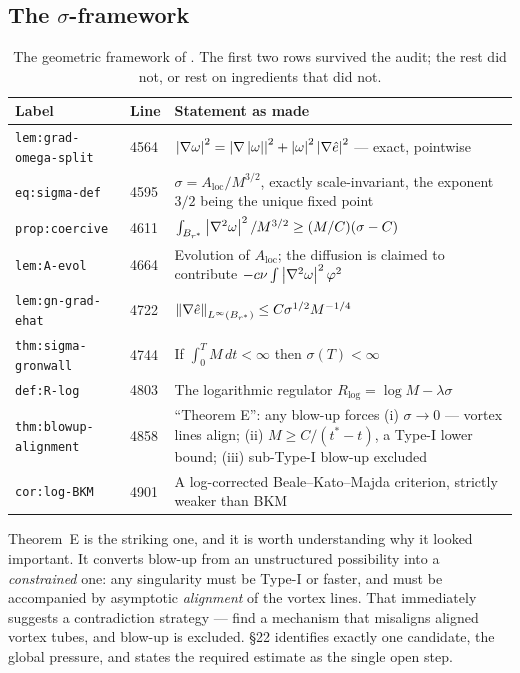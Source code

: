 \subsection{The \texorpdfstring{\(\sigma\)}{sigma}-framework}

\begin{table}[ht]
\centering
\small
\begin{tabular}{@{}l l p{}@{}}
\toprule
Label & Line & Statement as made \\
\midrule
\texttt{lem:grad-omega-split} & 4564
  & \(\left|\nabla\omega\right|^2=\left|\nabla\left|\omega\right|\right|^2
    +\left|\omega\right|^2\left|\nabla\hat{e}\right|^2\) --- exact, pointwise \\[3pt]
\texttt{eq:sigma-def} & 4595
  & \(\sigma=A_{\mathrm{loc}}/M^{3/2}\), exactly scale-invariant, the exponent
    \(3/2\) being the unique fixed point \\[3pt]
\texttt{prop:coercive} & 4611
  & \(\int_{B_{r^{*}}}\left|\nabla^2\omega\right|^2/M^{3/2}\ge(M/C)(\sigma-C)\) \\[3pt]
\texttt{lem:A-evol} & 4664
  & Evolution of \(A_{\mathrm{loc}}\); the diffusion is claimed to contribute
    \(-c\nu\int\left|\nabla^2\omega\right|^2\varphi^2\) \\[3pt]
\texttt{lem:gn-grad-ehat} & 4722
  & \(\left\|\nabla\hat{e}\right\|_{L^\infty(B_{r^{*}})}\le C\sigma^{1/2}M^{-1/4}\) \\[3pt]
\texttt{thm:sigma-gronwall} & 4744
  & If \(\int_0^TM\,dt<\infty\) then \(\sigma(T)<\infty\) \\[3pt]
\texttt{def:R-log} & 4803
  & The logarithmic regulator \(R_{\log}=\log M-\lambda\sigma\) \\[3pt]
\texttt{thm:blowup-alignment} & 4858
  & ``Theorem E'': any blow-up forces (i) \(\sigma\to0\) --- vortex lines
    align; (ii) \(M\ge C/(t^*-t)\), a Type-I lower bound; (iii) sub-Type-I
    blow-up excluded \\[3pt]
\texttt{cor:log-BKM} & 4901
  & A log-corrected Beale--Kato--Majda criterion, strictly weaker than BKM \\
\bottomrule
\end{tabular}
\caption[The  \(\sigma\)-framework]{The geometric framework of .
The first two rows survived the audit; the rest did not, or rest on
ingredients that did not.}
\label{tab:sigma-framework}
\end{table}

Theorem~E is the striking one, and it is worth understanding why it looked
important. It converts blow-up from an unstructured possibility into a
\emph{constrained} one: any singularity must be Type-I or faster, and must be
accompanied by asymptotic \emph{alignment} of the vortex lines. That
immediately suggests a contradiction strategy --- find a mechanism that
misaligns aligned vortex tubes, and blow-up is excluded. \S22 identifies
exactly one candidate, the global pressure, and states the required estimate
as the single open step.

